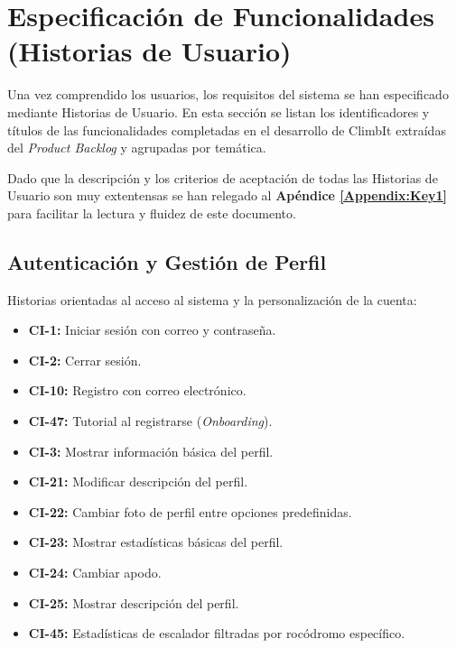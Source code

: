 \section{Especificación de Funcionalidades (Historias de Usuario)}

Una vez comprendido los usuarios, los requisitos del sistema se han especificado mediante Historias de Usuario. En esta sección se listan los identificadores y títulos de las funcionalidades completadas en el desarrollo de ClimbIt extraídas del \textit{Product Backlog} y agrupadas por temática. 

Dado que la descripción y los criterios de aceptación de todas las Historias de Usuario son muy extentensas se han relegado al \textbf{Apéndice \ref{Appendix:Key1}} para facilitar la lectura y fluidez de este documento.

\subsection{Autenticación y Gestión de Perfil}
Historias orientadas al acceso al sistema y la personalización de la cuenta:
\begin{itemize}
    \item \textbf{CI-1:} Iniciar sesión con correo y contraseña.
    \item \textbf{CI-2:} Cerrar sesión.
    \item \textbf{CI-10:} Registro con correo electrónico.
    \item \textbf{CI-47:} Tutorial al registrarse (\textit{Onboarding}).
    \item \textbf{CI-3:} Mostrar información básica del perfil.
    \item \textbf{CI-21:} Modificar descripción del perfil.
    \item \textbf{CI-22:} Cambiar foto de perfil entre opciones predefinidas.
    \item \textbf{CI-23:} Mostrar estadísticas básicas del perfil.
    \item \textbf{CI-24:} Cambiar apodo.
    \item \textbf{CI-25:} Mostrar descripción del perfil.
    \item \textbf{CI-45:} Estadísticas de escalador filtradas por rocódromo específico.
\end{itemize}


